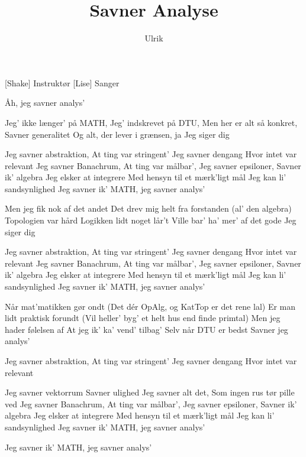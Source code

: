 \documentclass[a4paper,11pt]{article}
\title{Savner Analyse}
\author{Ulrik}
\begin{document}
\maketitle

\begin{roles}
[Shake] Instruktør
[Lise] Sanger 

\end{roles}

\begin{song}


 Åh, jeg savner analys’
 
Jeg’ ikke længer’ på MATH,
Jeg’ indskrevet på DTU,
Men her er alt så konkret,
Savner generalitet
Og alt, der lever i grænsen, ja
Jeg siger dig
 
Jeg savner abstraktion,
At ting var stringent’
Jeg savner dengang
Hvor intet var relevant
Jeg savner Banachrum,
At ting var målbar’,
Jeg savner epsiloner,
Savner ik’ algebra
Jeg elsker at integrere
Med hensyn til et mærk’ligt mål
Jeg kan li’ sandsynlighed
Jeg savner ik’ MATH, jeg savner analys’
 
Men jeg fik nok af det andet
Det drev mig helt fra forstanden (al’ den algebra)
Topologien var hård
Logikken lidt noget lår’t
Ville bar’ ha’ mer’ af det gode
Jeg siger dig
 
Jeg savner abstraktion,
At ting var stringent’
Jeg savner dengang
Hvor intet var relevant
Jeg savner Banachrum,
At ting var målbar’,
Jeg savner epsiloner,
Savner ik’ algebra
Jeg elsker at integrere
Med hensyn til et mærk’ligt mål
Jeg kan li’ sandsynlighed
Jeg savner ik’ MATH, jeg savner analys’
 
Når mat’matikken gør ondt
(Det dér OpAlg, og KatTop er det rene lal)
Er man lidt praktisk forundt
(Vil heller’ byg’ et helt hus end finde primtal)
Men jeg hader følelsen af
At jeg ik’ ka’ vend’ tilbag’
Selv når DTU er bedst
Savner jeg analys’
 
Jeg savner abstraktion,
At ting var stringent’
Jeg savner dengang
Hvor intet var relevant
 
Jeg savner vektorrum
Savner ulighed
Jeg savner alt det,
Som ingen rus tør pille ved
Jeg savner Banachrum,
At ting var målbar’,
Jeg savner epsiloner,
Savner ik’ algebra
Jeg elsker at integrere
Med hensyn til et mærk’ligt mål
Jeg kan li’ sandsynlighed
Jeg savner ik’ MATH, jeg savner analys’
 
Jeg savner ik’ MATH, jeg savner analys’








\end{song}
\end{document}
